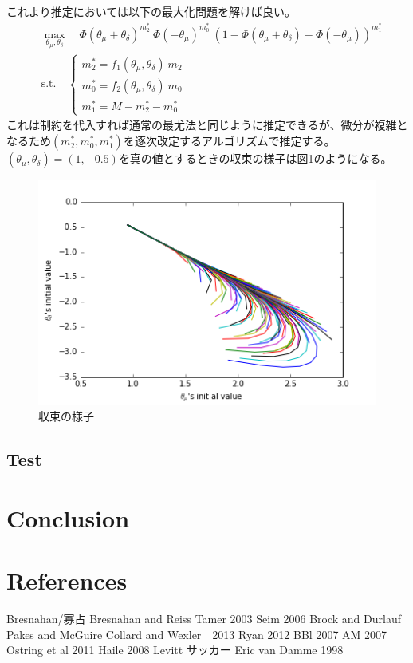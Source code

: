 \documentclass{jsarticle}
\begin{document}
これより推定においては以下の最大化問題を解けば良い。
\begin{align*}
	&\max_{\theta_{\mu}, \theta_{\delta}}\quad \Phi(\theta_{\mu}+\theta_{\delta})^{m_2^{*}}\ \Phi(-\theta_{\mu})^{m_0^{*}}\  (1- \Phi(\theta_{\mu}+\theta_{\delta}) - \Phi(-\theta_{\mu}))^{m_1^{*}}\\
	&\text{s.t.}\quad \begin{cases}
	m_2^{*} = f_1(\theta_{\mu}, \theta_{\delta})\ m_2\\
	m_0^{*} = f_2(\theta_{\mu}, \theta_{\delta})\ m_0\\
	m_1^{*} = M - m_2^{*} - m_0^{*}
	\end{cases}
\end{align*}
これは制約を代入すれば通常の最尤法と同じように推定できるが、微分が複雑となるため$(m_2^{*},m_0^{*},m_1^{*})$を逐次改定するアルゴリズムで推定する。$(\theta_{\mu}, \theta_{\delta}) = (1, -0.5)$を真の値とするときの収束の様子は図1のようになる。
\begin{figure}[h]
\centering
\includegraphics{conversion.png}
\caption{収束の様子}
\end{figure}


\subsection{Test}


\section{Conclusion}

\section{References}
\begin{thebibliography}{10}
	 Bresnahan/寡占
	 Bresnahan and Reiss
	 Tamer 2003
	 Seim 2006
	 Brock and Durlauf
	 Pakes and McGuire
	 Collard and Wexler　2013
	 Ryan 2012
	 BBl 2007
	 AM 2007
	 Ostring et al 2011
	 Haile 2008
	 Levitt サッカー
	 Eric van Damme 1998
\end{thebibliography}
\end{document}
